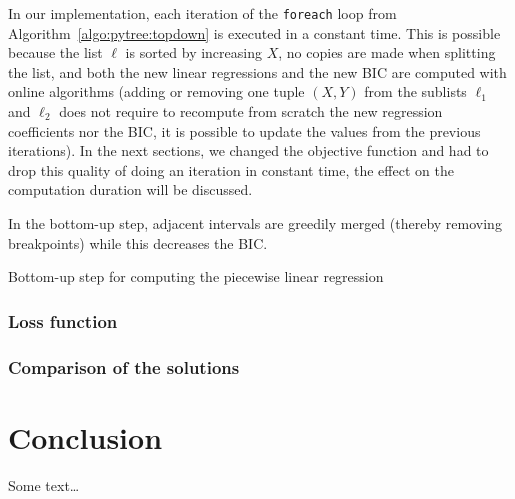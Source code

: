                 In our implementation, each iteration of the \texttt{foreach} loop from
                Algorithm~\ref{algo:pytree:topdown} is executed in a constant time. This is possible because the list
                \(\ell\) is sorted by increasing \(X\), no copies are made when splitting the list, and both the new linear
                regressions and the new BIC are computed with online algorithms (\ie adding or removing one tuple
                \((X,Y)\) from the sublists \(\ell_1\) and \(\ell_2\) does not require to recompute from scratch the new
                regression coefficients nor the BIC, it is possible to update the values from the previous iterations).
                In the next sections, we changed the objective function and had to drop this quality of doing an
                iteration in constant time, the effect on the computation duration will be discussed.

                In the bottom-up step, adjacent intervals are greedily merged (thereby removing breakpoints) while this
                decreases the BIC.
                \begin{algorithm}
                    \DontPrintSemicolon
                    \Fn{\Fbottomup{\(\ell\)}}{
                        [...]
                    }
                    \caption{Bottom-up step for computing the piecewise linear regression}
                    \label{algo:pytree:bottomup}
                \end{algorithm}

            \subsubsection{Loss function}%

            \subsubsection{Comparison of the solutions}%

    \section{Conclusion}%
        Some text\dots

